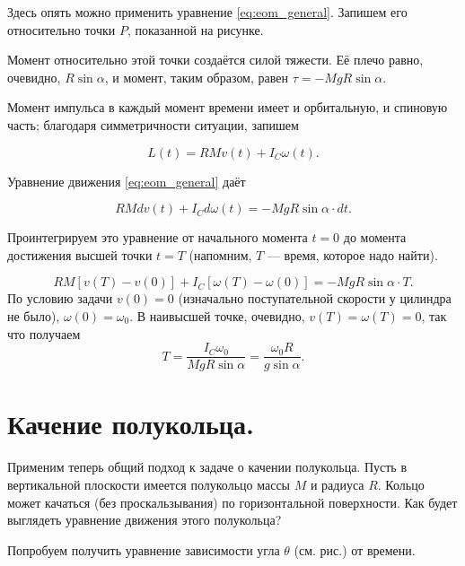 \documentclass[a4paper,12pt]{article}
\begin{document}
Здесь опять можно применить уравнение \eqref{eq:eom_general}. Запишем
его относительно точки $P$, показанной на рисунке.

Момент относительно этой точки создаётся силой тяжести. Её плечо
равно, очевидно, $R \sin \alpha$, и момент, таким образом, равен $\tau
= -MgR \sin \alpha$.

Момент импульса в каждый момент времени имеет и орбитальную, и
спиновую часть; благодаря симметричности ситуации, запишем

\begin{equation}
  \label{eq:L_cylinder_1}
  L (t) = RM v(t) + I_C \omega (t). 
\end{equation}

Уравнение движения \eqref{eq:eom_general} даёт

\begin{equation}
  \label{eq:L_cylinder_2}
  R M d v(t) + I_C d \omega(t) = -MgR \sin \alpha \cdot dt. 
\end{equation}

Проинтегрируем это уравнение от начального момента $t=0$ до момента
достижения высшей точки $t=T$ (напомним, $T$ --- время, которое надо
найти). 

\begin{equation}
  \label{eq:L_cylinder_3}
  RM [ v(T) - v(0)] + I_C [ \omega(T) - \omega(0) ] = - MgR \sin
  \alpha \cdot T. 
\end{equation}
По условию задачи $v(0)=0$ (изначально поступательной скорости у
цилиндра не было), $\omega(0) = \omega_0$. В наивысшей точке,
очевидно, $v(T)=\omega(T)=0$, так что получаем
\begin{equation}
  \label{eq:L_cylinder_answer}
  T = \frac{I_C\omega_0}{MgR \sin \alpha} = \frac{\omega_0 R}{g \sin
    \alpha }. 
\end{equation}

\section{Качение полукольца. }
\label{sec:semihoop}

Применим теперь общий подход к задаче о качении полукольца. Пусть
в вертикальной плоскости имеется полукольцо массы $M$ и радиуса
$R$. Кольцо может качаться (без проскальзывания) по горизонтальной
поверхности. Как будет выглядеть уравнение движения этого полукольца?

Попробуем получить уравнение зависимости угла $\theta$ (см. рис.) от
времени. 
\end{document}
